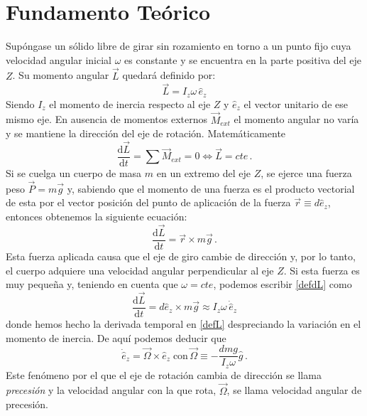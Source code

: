 \documentclass[a4paper]{article}
\begin{document}
\section{Fundamento Teórico} \label{sec:fundamento}
Supóngase un sólido libre de girar sin rozamiento en torno a un punto fijo cuya velocidad angular inicial $\omega$ es constante y se encuentra en la parte positiva del eje $Z$. Su momento angular $\vec{L}$ quedará definido por:
\begin{equation}
\label{defL}
\vec{L}=I_z \omega\, \hat{e}_{z}
\end{equation}
Siendo $I_z$ el momento de inercia respecto al eje $Z$ y $\hat{e}_{z}$ el vector unitario de ese mismo eje. En ausencia de momentos externos $\vec{M}_{ext}$	el momento angular no varía y se mantiene la dirección del eje de rotación. Matemáticamente
\begin{equation}
\frac{\mathrm{d}\vec{L}}{\mathrm{d}t}=\sum \vec{M}_{ext} =0\Leftrightarrow\vec{L}=cte\,.
\end{equation}
Si se cuelga un cuerpo de masa $m$ en un extremo del eje $Z$, se ejerce una fuerza peso $\vec{P}=m\vec{g}$ y, sabiendo que el momento de una fuerza es el producto vectorial de esta por el vector posición del punto de aplicación de la fuerza $\vec{r}\equiv d\hat{e}_z$, entonces obtenemos la siguiente ecuación: 
\begin{equation}
\label{defdL}
\frac{\mathrm{d}\vec{L}}{\mathrm{d}t}=\vec{r}\times m\vec{g}\,.
\end{equation}
Esta fuerza aplicada causa que el eje de giro cambie de dirección y, por lo tanto, el cuerpo adquiere una velocidad angular perpendicular al eje $Z$. Si esta fuerza es muy pequeña y, teniendo en cuenta que $\omega=cte$, podemos escribir \ref{defdL} como 
\begin{equation}
\frac{\mathrm{d}\vec{L}}{\mathrm{d}t}=d\hat{e}_z\times m\vec{g}\approx I_z \omega\, \dot{\hat{e}}_{z}
\end{equation}
donde hemos hecho la derivada temporal en \ref{defL} despreciando la variación en el momento de inercia. De aquí podemos deducir que 
\begin{equation}
\label{defOmega}
\dot{\hat{e}}_{z}=\vec{\Omega}\times \hat{e}_z\;\text{con}\,\vec{\Omega}\equiv -\frac{dmg}{I_z\omega}\hat{g}\,.
\end{equation}
Este fenómeno por el que el eje de rotación cambia de dirección se llama \textit{precesión} y la velocidad angular con la que rota, $\vec{\Omega}$, se llama velocidad angular de precesión.
\end{document}
